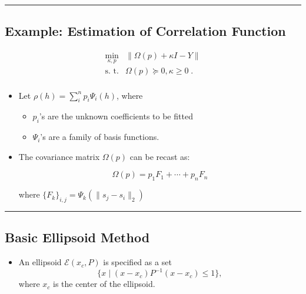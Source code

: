 \documentclass[]{article}
\providecommand{\tightlist}{%
  \setlength{\itemsep}{0pt}\setlength{\parskip}{0pt}}
\begin{document}
\begin{center}\rule{0.5\linewidth}{\linethickness}\end{center}

\hypertarget{example-estimation-of-correlation-function}{%
\subsection{Example: Estimation of Correlation
Function}\label{example-estimation-of-correlation-function}}

\[\begin{array}{ll}
   \min_{\kappa, p}   & \| \Omega(p) + \kappa I - Y \| \\
   \text{s. t.} & \Omega(p) \succcurlyeq 0,  \kappa \geq 0 \; .\\
 \end{array}\]

\begin{itemize}
\item
  Let \(\rho(h) = \sum_i^n p_i \Psi_i(h)\), where

  \begin{itemize}
  \tightlist
  \item
    \(p_i\)'s are the unknown coefficients to be fitted
  \item
    \(\Psi_i\)'s are a family of basis functions.
  \end{itemize}
\item
  The covariance matrix \(\Omega(p)\) can be recast as:

  \[\Omega(p) = p_1 F_1 + \cdots + p_n F_n\]

  where \(\{F_k\}_{i,j} =\Psi_k( \| s_j - s_i \|_2)\)
\end{itemize}

\begin{center}\rule{0.5\linewidth}{\linethickness}\end{center}

\hypertarget{basic-ellipsoid-method}{%
\subsection{Basic Ellipsoid Method}\label{basic-ellipsoid-method}}

\begin{itemize}
\tightlist
\item
  An ellipsoid \(\mathcal{E}(x_c, P)\) is specified as a set
  \[\{x \mid (x-x_c)P^{-1}(x-x_c) \leq 1 \},\] where \(x_c\) is the
  center of the ellipsoid.
\end{itemize}
\end{document}
